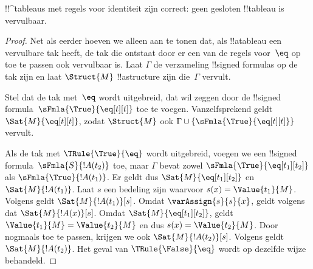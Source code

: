 \documentclass[../../../include/open-logic-section]{subfiles}
\begin{document}


\begin{prop}
!!^{tableau}s met regels voor identiteit zijn correct: geen gesloten
!!{tableau} is vervulbaar.
\end{prop}

\begin{proof}
Net als eerder hoeven we alleen aan te tonen dat, als !!a{tableau} een
vervulbare tak heeft, de tak die ontstaat door er een van de regels
voor~$\eq$ op toe te passen ook vervulbaar is. Laat $\Gamma$ de
verzameling !!{signed formula}s op de tak zijn en laat $\Struct{M}$
!!a{structure} zijn die~$\Gamma$ vervult.

Stel dat de tak met~$\eq$ wordt uitgebreid, dat wil zeggen door de
!!{signed formula}~$\sFmla{\True}{\eq[t][t]}$ toe te voegen.
Vanzelfsprekend geldt $\Sat{M}{\eq[t][t]}$, zodat $\Struct{M}$ ook
$\Gamma \cup \{\sFmla{\True}{\eq[t][t]}\}$ vervult.

Als de tak met $\TRule{\True}{\eq}$ wordt uitgebreid, voegen we een
!!{signed formula}~$\sFmla{S}{!A(t_2)}$ toe, maar $\Gamma$ bevat zowel
$\sFmla{\True}{\eq[t_1][t_2]}$ als $\sFmla{\True}{!A(t_1)}$. Er geldt
dus $\Sat{M}{\eq[t_1][t_2]}$ en $\Sat{M}{!A(t_1)}$. Laat $s$ een
bedeling zijn waarvoor $s(x) = \Value{t_1}{M}$. Volgens
 geldt
$\Sat{M}{!A(t_1)}[s]$. Omdat $\varAssign{s}{s}{x}$, geldt volgens
 dat $\Sat{M}{!A(x)}[s]$. Omdat
$\Sat{M}{\eq[t_1][t_2]}$, geldt
$\Value{t_1}{M} = \Value{t_2}{M}$ en dus $s(x) = \Value{t_2}{M}$.
Door  nogmaals toe te passen,
krijgen we ook $\Sat{M}{!A(t_2)}[s]$. Volgens
 geldt
$\Sat{M}{!A(t_2)}$. Het geval van $\TRule{\False}{\eq}$ wordt op
dezelfde wijze behandeld.
\end{proof}
\end{document}

